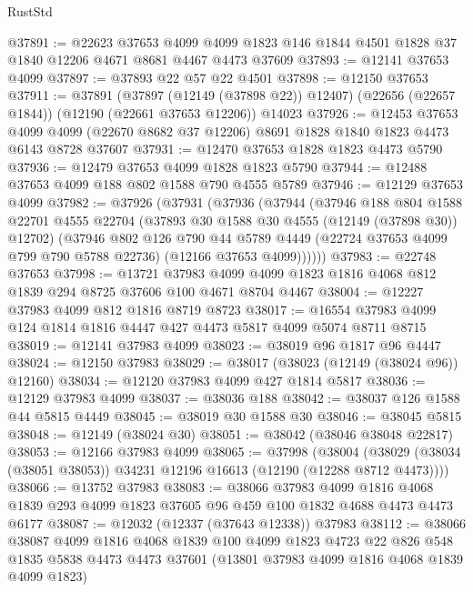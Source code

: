 \begin{lexlean}{RustStd}
\begin{coremodule}
@37891 := @22623
    @37653
    @4099
    @4099
    @1823
    @146
    @1844
    @4501
    @1828
    @37
    @1840
    @12206
    @4671
    @8681
    @4467
    @4473
    @37609
@37893 := @12141 @37653 @4099
@37897 := @37893 @22 @57 @22 @4501
@37898 := @12150 @37653
@37911 := @37891
    (@37897 (@12149 (@37898 @22)) @12407)
    (@22656 (@22657 @1844))
    (@12190 (@22661 @37653 @12206))
    @14023
@37926 := @12453
    @37653
    @4099
    @4099
    (@22670 @8682 @37 @12206)
    @8691
    @1828
    @1840
    @1823
    @4473
    @6143
    @8728
    @37607
@37931 := @12470 @37653 @1828 @1823 @4473 @5790
@37936 := @12479 @37653 @4099 @1828 @1823 @5790
@37944 := @12488 @37653 @4099 @188 @802 @1588 @790 @4555 @5789
@37946 := @12129 @37653 @4099
@37982 := @37926
    (@37931
      (@37936
        (@37944
          (@37946
            @188
            @804
            @1588
            @22701
            @4555
            @22704
            (@37893 @30 @1588 @30 @4555 (@12149 (@37898 @30)) @12702)
            (@37946
              @802
              @126
              @790
              @44
              @5789
              @4449
              (@22724 @37653 @4099 @799 @790 @5788 @22736)
              (@12166 @37653 @4099))))))
@37983 := @22748 @37653
@37998 := @13721
    @37983
    @4099
    @4099
    @1823
    @1816
    @4068
    @812
    @1839
    @294
    @8725
    @37606
    @100
    @4671
    @8704
    @4467
@38004 := @12227 @37983 @4099 @812 @1816 @8719 @8723
@38017 := @16554 @37983 @4099 @124 @1814 @1816 @4447 @427 @4473 @5817 @4099 @5074 @8711 @8715
@38019 := @12141 @37983 @4099
@38023 := @38019 @96 @1817 @96 @4447
@38024 := @12150 @37983
@38029 := @38017 (@38023 (@12149 (@38024 @96)) @12160)
@38034 := @12120 @37983 @4099 @427 @1814 @5817
@38036 := @12129 @37983 @4099
@38037 := @38036 @188
@38042 := @38037 @126 @1588 @44 @5815 @4449
@38045 := @38019 @30 @1588 @30
@38046 := @38045 @5815
@38048 := @12149 (@38024 @30)
@38051 := @38042 (@38046 @38048 @22817)
@38053 := @12166 @37983 @4099
@38065 := @37998
    (@38004 (@38029 (@38034 (@38051 @38053)) @34231 @12196 @16613 (@12190 (@12288 @8712 @4473))))
@38066 := @13752 @37983
@38083 := @38066
    @37983
    @4099
    @1816
    @4068
    @1839
    @293
    @4099
    @1823
    @37605
    @96
    @459
    @100
    @1832
    @4688
    @4473
    @4473
    @6177
@38087 := @12032 (@12337 (@37643 @12338)) @37983
@38112 := @38066
    @38087
    @4099
    @1816
    @4068
    @1839
    @100
    @4099
    @1823
    @4723
    @22
    @826
    @548
    @1835
    @5838
    @4473
    @4473
    @37601
    (@13801 @37983 @4099 @1816 @4068 @1839 @4099 @1823)

\end{coremodule}
\end{lexlean}
